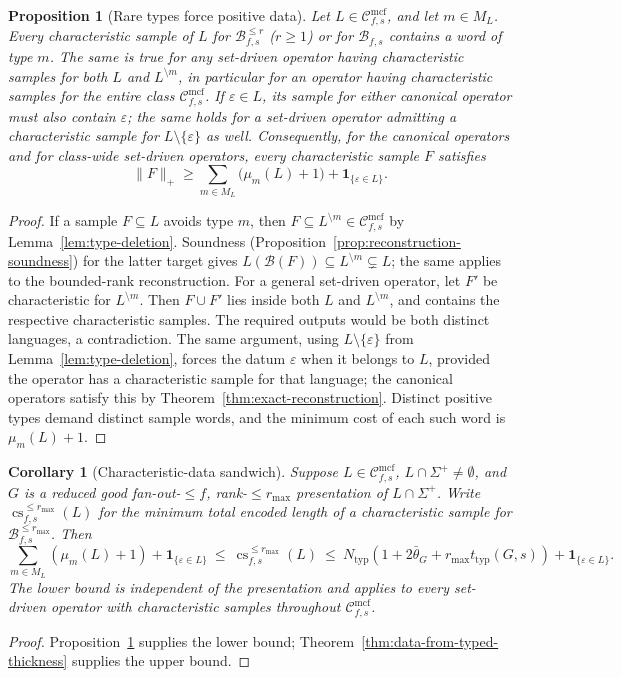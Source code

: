 \documentclass[11pt]{article}
\numberwithin{equation}{section}
\theoremstyle{plain}
\newtheorem{proposition}[theorem]{Proposition}
\newtheorem{corollary}[theorem]{Corollary}
\theoremstyle{definition}
\theoremstyle{remark}
\newcommand{\Cmcf}[2]{\mathcal{C}^{\mathrm{mcf}}_{#1,#2}}
\newcommand{\eps}{\varepsilon}
\begin{document}
\begin{proposition}[Rare types force positive data]
\label{prop:rare-type}
Let $L\in\Cmcf{f}{s}$, and let $m\in M_L$.
Every characteristic sample of $L$ for
$\mathcal B^{\le r}_{f,s}$ ($r\ge1$) or for $\mathcal B_{f,s}$
contains a word of type $m$. The same is true for any set-driven
operator having characteristic samples for both $L$ and
$L^{\setminus m}$, in particular for an operator having
characteristic samples for the entire class $\Cmcf{f}{s}$.
If $\eps\in L$, its sample for either canonical operator must
also contain $\eps$; the same holds for a set-driven operator admitting
a characteristic sample for $L\setminus\{\eps\}$ as well.
Consequently, for the canonical operators and for class-wide
set-driven operators, every characteristic sample $F$ satisfies
\[
 \|F\|_+\ge
 \sum_{m\in M_L}\bigl(\mu_m(L)+1\bigr)
 +\mathbf 1_{\{\eps\in L\}}.
\]
\end{proposition}
\begin{proof}
If a sample $F\subseteq L$ avoids type $m$, then
$F\subseteq L^{\setminus m}\in\Cmcf{f}{s}$ by
Lemma~\ref{lem:type-deletion}. Soundness
(Proposition~\ref{prop:reconstruction-soundness}) for the latter
target gives
$L(\mathcal B(F))\subseteq L^{\setminus m}\subsetneq L$;
the same applies to the bounded-rank reconstruction.
For a general set-driven operator, let $F'$ be characteristic for
$L^{\setminus m}$. Then $F\cup F'$ lies inside both $L$ and
$L^{\setminus m}$, and contains the respective characteristic samples.
The required outputs would be both distinct languages, a contradiction.
The same argument, using $L\setminus\{\eps\}$ from
Lemma~\ref{lem:type-deletion}, forces the datum $\eps$ when it belongs
to $L$, provided the operator has a characteristic sample for that
language; the canonical operators satisfy this by
Theorem~\ref{thm:exact-reconstruction}.
Distinct positive types demand distinct sample words,
and the minimum cost of each such word is $\mu_m(L)+1$.
\end{proof}

\begin{corollary}[Characteristic-data sandwich]
\label{cor:typed-sandwich}
Suppose $L\in\Cmcf{f}{s}$, $L\cap\Sigma^+\ne\emptyset$,
and $G$ is a reduced good fan-out-$\le f$, rank-$\le r_{\max}$
presentation of $L\cap\Sigma^+$. Write
$\operatorname{cs}^{\le r_{\max}}_{f,s}(L)$ for the minimum total
encoded length of a characteristic sample for
$\mathcal B^{\le r_{\max}}_{f,s}$. Then
\[
 \sum_{m\in M_L}(\mu_m(L)+1)+\mathbf 1_{\{\eps\in L\}}
 \ \le\ \operatorname{cs}^{\le r_{\max}}_{f,s}(L)
 \ \le\ N_{\mathrm{typ}}
  (1+2\bar\theta_G+r_{\max}t_{\mathrm{typ}}(G,s))
 +\mathbf 1_{\{\eps\in L\}}.
\]
The lower bound is independent of the presentation and applies to
every set-driven operator with characteristic samples throughout
$\Cmcf{f}{s}$.
\end{corollary}
\begin{proof}
Proposition~\ref{prop:rare-type} supplies the lower bound;
Theorem~\ref{thm:data-from-typed-thickness} supplies the upper bound.
\end{proof}
\end{document}
